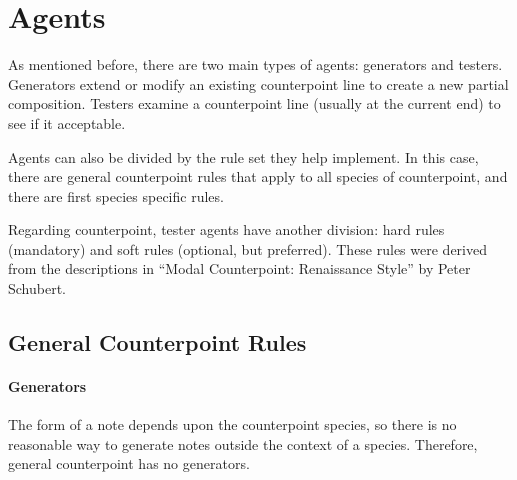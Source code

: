 \section{Agents}

As mentioned before, there are two main types of agents: generators and testers.
Generators extend or modify an existing counterpoint line to create a new partial composition.
Testers examine a counterpoint line (usually at the current end) to see if it acceptable.

%

Agents can also be divided by the rule set they help implement. 
In this case, there are general counterpoint rules that apply to all species of counterpoint, and there are first species specific rules.

Regarding counterpoint, tester agents have another division: hard rules (mandatory) and soft rules (optional, but preferred).
These rules were derived from the descriptions in ``Modal Counterpoint: Renaissance Style'' by Peter Schubert. %

\subsection{General Counterpoint Rules}

\paragraph{Generators}
The form of a note depends upon the counterpoint species, so there is no reasonable way to generate notes outside the context of a species.
Therefore, general counterpoint has no generators.

